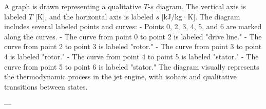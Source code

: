 A graph is drawn representing a qualitative \( T \)-\( s \) diagram. The vertical axis is labeled \( T \) [K], and the horizontal axis is labeled \( s \) [kJ/kg·K]. The diagram includes several labeled points and curves:  
- Points 0, 2, 3, 4, 5, and 6 are marked along the curves.  
- The curve from point 0 to point 2 is labeled "drive line."  
- The curve from point 2 to point 3 is labeled "rotor."  
- The curve from point 3 to point 4 is labeled "rotor."  
- The curve from point 4 to point 5 is labeled "stator."  
- The curve from point 5 to point 6 is labeled "stator."  
The diagram visually represents the thermodynamic process in the jet engine, with isobars and qualitative transitions between states.

---